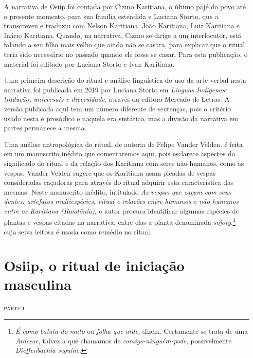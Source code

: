  A narrativa de Osiip foi contada por Cizino Karitiana, o último pajé do
 povo até o presente momento, para sua família estendida e Luciana
 Storto, que a transcreveu e traduziu com Nelson Karitiana, João
 Karitiana, Luiz Karitiana e Inácio Karitiana. Quando, na narrativa,
 Cizino se dirige a um interlocutor, está falando a seu filho mais velho
 que ainda não se casara, para explicar que o ritual teria sido
 necessário no passado quando ele fosse se casar. Para esta publicação, o
 material foi editado por Luciana Storto e Ivan Karitiana.

 Uma primeira descrição do ritual e análise linguística do uso da arte
 verbal nesta narrativa foi publicada em 2019 por Luciana Storto em
 \textit{Línguas Indígenas: tradução, universais e diversidade}, através da
 editora Mercado de Letras. A versão publicada aqui tem um número
 diferente de sentenças, pois o critério usado nesta é prosódico e
 naquela era sintático, mas a divisão da narrativa em partes permanece a
 mesma.

 Uma análise antropológica do ritual, de autoria de Felipe Vander Velden,
 é feita em um manuscrito inédito que comentaremos aqui, pois esclarece
 aspectos do significado do ritual e da relação dos Karitiana com seres
 não-humanos, como as vespas. Vander Velden sugere que os Karitiana usam
 picadas de vespas consideradas caçadoras para através do ritual adquirir
 esta característica das mesmas. Neste manuscrito inédito, intitulado
\textit{As vespas que caçam com seus dentes: artefatos multiespécies, ritual e
 relações entre humanos e não-humanos entre os Karitiana (Rondônia)}, o
 autor procura identificar algumas espécies de plantas e vespas citadas
 na narrativa, entre elas a planta denominada \textit{sojoty},\footnote{ \textit{É como batata do mato} ou \textit{folha que arde},
 dizem. Certamente se trata de uma \textit{Araceae}, talvez a que chamamos
 de  \textit{comigo-ninguém-pode}, possivelmente \textit{Dieffenbachia
 seguine}.} cuja seiva
 leitosa é usada como remédio no ritual.
 \vspace*{\fill}

 \chapter{Osiip, o ritual de iniciação masculina}
 
 \begin{flushright}\textsc{parte i}\end{flushright}


